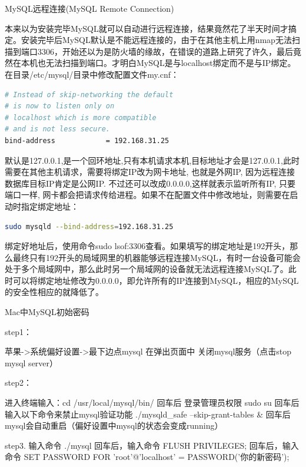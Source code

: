 \documentclass[12pt]{book}
\makeatletter
\numberwithin{dummy}{section}
\theoremstyle{ocrenumbox}
\theoremstyle{blacknumex}
\theoremstyle{blacknumbox}
\theoremstyle{ocrenum}
\renewcommand{\subsection}{\@startsection {subsection}{2}{\z@}
	{-3ex \@plus -0.1ex \@minus -.4ex}
	{0.5ex \@plus.2ex }
	{\normalfont\sffamily\bfseries}}
\renewcommand\paragraph{\@startsection{paragraph}{4}{\z@}
	{-2ex \@plus-.2ex \@minus .2ex}
	{.1ex}
	{\normalfont\small\sffamily\bfseries}}
\makeatother
\begin{document}
\paragraph{MySQL远程连接(MySQL Remote Connection)}

本来以为安装完毕MySQL就可以自动进行远程连接，结果竟然花了半天时间才搞定。安装完毕后MySQL默认是不能远程连接的，由于在其他主机上用nmap无法扫描到端口3306，开始还以为是防火墙的缘故，在错误的道路上研究了许久，最后竟然在本机也无法扫描到端口。才明白MySQL是与localhost绑定而不是与IP绑定。在目录/etc/mysql/目录中修改配置文件my.cnf：

\begin{lstlisting}[language=Bash]
# Instead of skip-networking the default 
# is now to listen only on
# localhost which is more compatible 
# and is not less secure.
bind-address            = 192.168.31.25
\end{lstlisting}

默认是127.0.0.1,是一个回环地址,只有本机请求本机,目标地址才会是127.0.0.1,此时需要在其他主机请求，需要将绑定IP改为网卡地址, 也就是外网IP, 因为远程连接数据库目标IP肯定是公网IP. 不过还可以改成0.0.0.0,这样就表示监听所有IP, 只要端口一样, 网卡都会把请求传给进程。如果不在配置文件中修改地址，则需要在启动时指定绑定地址：

\begin{lstlisting}[language=Bash]
sudo mysqld --bind-address=192.168.31.25
\end{lstlisting}

绑定好地址后，使用命令sudo lsof:3306查看。如果填写的绑定地址是192开头，那么最终只有192开头的局域网里的机器能够远程连接MySQL，有时一台设备可能会处于多个局域网中，那么此时另一个局域网的设备就无法远程连接MySQL了。此时可以将绑定地址修改为0.0.0.0，即允许所有的IP连接到MySQL，相应的MySQL的安全性相应的就降低了。

\subsection{Mac中MySQL初始密码}

step1：

苹果->系统偏好设置->最下边点mysql 在弹出页面中 关闭mysql服务（点击stop mysql server）

step2：

进入终端输入：cd /usr/local/mysql/bin/
回车后 登录管理员权限 sudo su
回车后输入以下命令来禁止mysql验证功能 ./mysqld\_safe --skip-grant-tables \&
回车后mysql会自动重启（偏好设置中mysql的状态会变成running）

step3. 
输入命令 ./mysql
回车后，输入命令 FLUSH PRIVILEGES; 
回车后，输入命令 SET PASSWORD FOR 'root'@'localhost' = PASSWORD('你的新密码');
\end{document}
